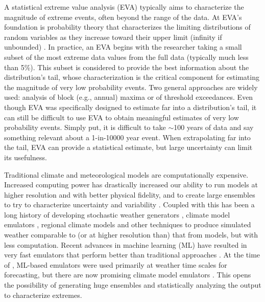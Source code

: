 \documentclass{ametsocV6.1}
\begin{document}
A statistical extreme value analysis (EVA) typically aims to characterize the magnitude of extreme events, often beyond the range of the data.
At EVA's foundation is probability theory that characterizes the limiting distributions of random variables as they increase toward their upper limit (infinity if unbounded) \citep{coles2001introduction}.
In practice, an EVA begins with the researcher taking a small subset of the most extreme data values from the full data (typically much less than 5\%). This subset is considered to provide the best information about the distribution's tail, whose characterization is the critical component for estimating the magnitude of very low probability events. 
Two general approaches are widely used: analysis of block (e.g., annual) maxima or of threshold exceedances. %
Even though EVA was specifically designed to estimate far into a distribution's tail, 
it can still be difficult to use EVA to obtain meaningful estimates of very low probability events.
Simply put, it is difficult to take $\sim$100 years of data and say something relevant about a 1-in-10000 year event. 
When extrapolating far into the tail, EVA can provide a  statistical estimate, but large uncertainty can limit its usefulness.


Traditional climate and meteorological models are computationally expensive. Increased computing power has drastically increased our ability to run models at higher resolution and with better physical fidelity, and to create large ensembles to try to characterize uncertainty and variability \citep{FlatoEtAl2013,nasem2024pmp}. Coupled with this has been a long history of developing stochastic weather generators \citep{ailliot2015stochastic}, climate model emulators \citep{tebaldi2025emulators}, regional climate models \citep{giorgi2019thirty} and other techniques to produce simulated weather comparable to (or at higher resolution than) that from models, but with less computation. Recent advances in machine learning (ML) have resulted in very fast emulators that perform better than traditional approaches \citep{bi2023accurate,lam2023learning,price2025probabilistic}. At the time of \citet{nasem2024pmp}, ML-based emulators were used primarily at weather time scales for forecasting, but there are now promising climate model emulators \citep{chapman2025camulator,cresswell2024deep,watt2025ace2}. This opens the possibility of generating huge ensembles and statistically analyzing the output to characterize extremes. 
\end{document}
